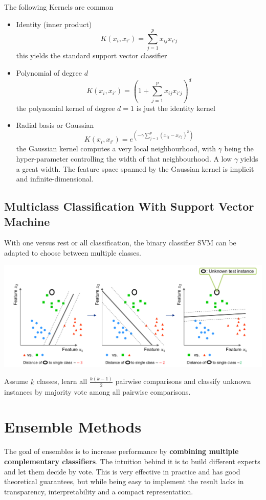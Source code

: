 \documentclass[11pt]{article}
\theoremstyle{definition}
\begin{document}
The following Kernels are common
\begin{itemize}[noitemsep]
	\item {\color{DodgerBlue2} Identity (inner product)}
	\begin{equation*}
		K(x_i,x_{i'}) = \sum_{j=1}^{p} x_{ij}x_{i'j}
	\end{equation*}
	this yields the standard support vector classifier
	\item {\color{DodgerBlue2} Polynomial of degree $d$}
	\begin{equation*}
		K(x_i,x_{i'}) = \left(1 + \sum_{j=1}^{p} x_{ij}x_{i'j}\right)^d
	\end{equation*}
	the polynomial kernel of degree $d = 1$ is just the identity kernel
	\item {\color{DodgerBlue2} Radial basis or Gaussian}
	\begin{equation*}
		K(x_i,x_{i'}) = e^{\left( -\gamma \sum_{j=1}^{p}(x_{ij} - x_{i'j})^2 \right)}
	\end{equation*}
	the Gaussian kernel computes a very local neighbourhood, with $\gamma$ being the hyper-parameter controlling the width of that neighbourhood. A low $\gamma$ yields a great width. The feature space spanned by the Gaussian kernel is implicit and infinite-dimensional.
\end{itemize}

\subsection{Multiclass Classification With Support Vector Machine}
With one versus rest or all classification, the binary classifier SVM can be adapted to choose between multiple classes.
\begin{center}
	\includegraphics[width=0.8\linewidth]{img/support_vector_machine_multiclass}
\end{center}
Assume $k$ classes, learn all $\frac{k(k-1)}{2}$ pairwise comparisons and classify unknown instances by majority vote among all pairwise comparisons.

\section{Ensemble Methods}
The goal of ensembles is to increase performance by \textbf{combining multiple complementary classifiers}. The intuition behind it is to build different experts and let them decide by vote. This is {\color{Green3} very effective in practice} and has {\color{Green3}good theoretical guarantees}, but while being {\color{Green3} easy to implement} the result {\color{Firebrick3} lacks in transparency}, {\color{Firebrick3}interpretability} and a {\color{Firebrick3} compact representation}.
\end{document}
